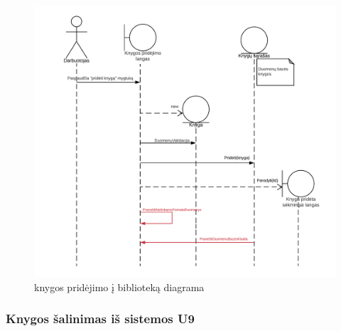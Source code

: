\documentclass{VUMIFPSkursinis}
\begin{document}
\begin{figure}[H]
    \label{fig:bookadddiag}
    \centering
    \includegraphics[width=1.05\textwidth]{Sekos_diagramos/prideti_knyga_seq_diag}
    \caption{knygos pridėjimo į biblioteką diagrama}
\end{figure}
 
\subsubsection{Knygos šalinimas iš sistemos U9}
\end{document}
